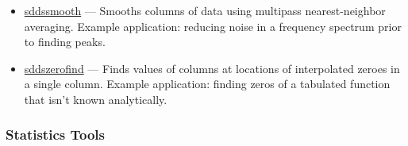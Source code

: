 \documentclass[11pt]{article}
\newcommand{\progref}[1]{\hyperref{#1}{{\tt #1} (}{)}{#1}}
\begin{document}
\begin{itemize}
\item \progref{sddssmooth} --- Smooths columns of data using multipass nearest-neighbor averaging.  Example
application: reducing noise in a frequency spectrum prior to finding peaks.

\item \progref{sddszerofind} --- Finds values of columns at locations of interpolated zeroes in a single column.
Example application: finding zeros of a tabulated function that isn't known analytically.

\end{itemize}

\subsubsection{Statistics Tools}
\end{document}
